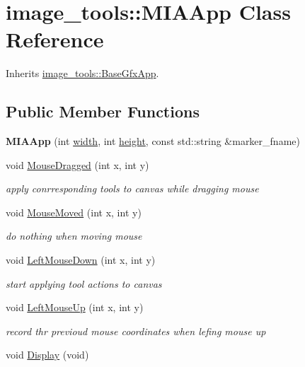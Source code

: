 \hypertarget{classimage__tools_1_1MIAApp}{}\section{image\+\_\+tools\+:\+:M\+I\+A\+App Class Reference}
\label{classimage__tools_1_1MIAApp}


Inherits \hyperlink{classimage__tools_1_1BaseGfxApp}{image\+\_\+tools\+::\+Base\+Gfx\+App}.

\subsection*{Public Member Functions}
\begin{DoxyCompactItemize}
\item 
{\bfseries M\+I\+A\+App} (int \hyperlink{classimage__tools_1_1BaseGfxApp_a2fe403c5392f624477c2ce4429f1a7b5}{width}, int \hyperlink{classimage__tools_1_1BaseGfxApp_aa961e13a7a8e6062204223cc33ac7503}{height}, const std\+::string \&marker\+\_\+fname)\hypertarget{classimage__tools_1_1MIAApp_a0fbfba996c29b82ef1c208e0ef0b802e}{}\label{classimage__tools_1_1MIAApp_a0fbfba996c29b82ef1c208e0ef0b802e}

\item 
void \hyperlink{classimage__tools_1_1MIAApp_a22de582c71210c873cde634130478158}{Mouse\+Dragged} (int x, int y)
\begin{DoxyCompactList}\small\item\em apply conrresponding tools to canvas while dragging mouse \end{DoxyCompactList}\item 
void \hyperlink{classimage__tools_1_1MIAApp_afe0b149a45cba12ab1f93d54911caec5}{Mouse\+Moved} (int x, int y)
\begin{DoxyCompactList}\small\item\em do nothing when moving mouse \end{DoxyCompactList}\item 
void \hyperlink{classimage__tools_1_1MIAApp_afbfdd2f2d0773e1202c4610ffb077d11}{Left\+Mouse\+Down} (int x, int y)
\begin{DoxyCompactList}\small\item\em start applying tool actions to canvas \end{DoxyCompactList}\item 
void \hyperlink{classimage__tools_1_1MIAApp_a2717842596d33af77f20644527a8b556}{Left\+Mouse\+Up} (int x, int y)
\begin{DoxyCompactList}\small\item\em record thr previoud mouse coordinates when lefing mouse up \end{DoxyCompactList}\item 
void \hyperlink{classimage__tools_1_1MIAApp_add76b61a146970333b216e027aabc3bc}{Display} (void)\hypertarget{classimage__tools_1_1MIAApp_add76b61a146970333b216e027aabc3bc}{}\label{classimage__tools_1_1MIAApp_add76b61a146970333b216e027aabc3bc}


\end{DoxyCompactItemize}
